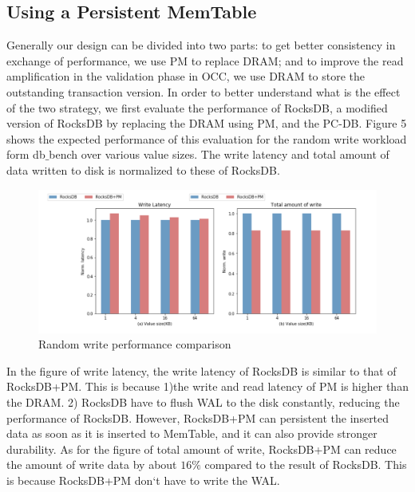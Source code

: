\subsection{Using a Persistent MemTable}
Generally our design can be divided into two parts: to get better consistency in exchange of performance, we use PM to replace DRAM; and to improve the read amplification in the validation phase in OCC, we use DRAM to store the outstanding transaction version. In order to better understand what is the effect of the two strategy, we first evaluate the performance of RocksDB,  a modified version of RocksDB by replacing the DRAM using PM, and the PC-DB. Figure 5 shows the expected performance of this evaluation for the random write workload form db$\_$bench over various value sizes. The write latency and total amount of data written to disk is normalized to these of RocksDB.
\begin{figure}
    \centering
    \includegraphics[width=0.36\paperwidth]{USENIX/figure/Randomwrite.png}
    \caption{Random write performance comparison}
    \label{fig:randomwrite}
\end{figure}
In the figure of write latency, the write latency of RocksDB is similar to that of RocksDB+PM. This is because 1)the write and read latency of PM is higher than the DRAM. 2) RocksDB have to flush WAL to the disk constantly, reducing the performance of RocksDB. However, RocksDB+PM can persistent the inserted data as soon as it is inserted to MemTable, and it can also provide stronger durability. As for the figure of total amount of write, RocksDB+PM can reduce the amount of write data by about $16\%$ compared to the result of RocksDB. This is because RocksDB+PM don`t have to write the WAL. 
